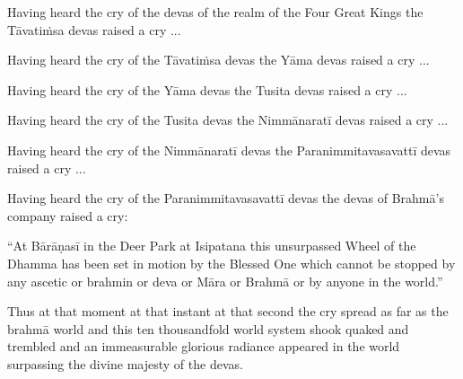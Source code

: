 \medskip

\begin{english-hang}
  Having heard the cry of the devas of the realm of the Four Great Kings the Tāvatiṁsa devas raised a cry ...
\end{english-hang}

\medskip

\begin{english-hang}
  Having heard the cry of the Tāvatiṁsa devas the Yāma devas raised a cry ...
\end{english-hang}

\medskip

\begin{english-hang}
  Having heard the cry of the Yāma devas the Tusita devas raised a cry ...
\end{english-hang}

\medskip

\begin{english-hang}
  Having heard the cry of the Tusita devas the Nimmānaratī devas raised a cry ...
\end{english-hang}

\medskip

\begin{english-hang}
  Having heard the cry of the Nimmānaratī devas the Paranimmitavasavattī devas raised a cry ...
\end{english-hang}

\medskip

\begin{english-hang}
  Having heard the cry of the Paranimmitavasavattī devas the devas of Brahmā's company raised a cry:
\end{english-hang}

\medskip

\begin{english-hang}
  ``At Bārāṇasī in the Deer Park at Isipatana this unsurpassed Wheel of the Dhamma has been set in motion by the Blessed One which cannot be stopped by any ascetic or brahmin or deva or Māra or Brahmā or by anyone in the world.''
\end{english-hang}

\medskip

\begin{english-hang}
  Thus at that moment at that instant at that second the cry spread as far as the brahmā world and this ten thousandfold world system shook quaked and trembled and an immeasurable glorious radiance appeared in the world surpassing the divine majesty of the devas.
\end{english-hang}

